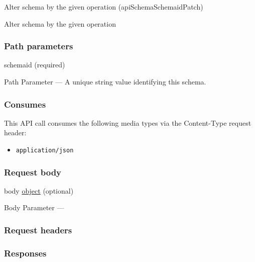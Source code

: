 \protect\hypertarget{apiSchemaSchemaidPatch}{}{}

\begin{Shaded}
\begin{Highlighting}[]
\end{Highlighting}
\end{Shaded}

Alter schema by the given operation ({apiSchemaSchemaidPatch})

Alter schema by the given operation

\hypertarget{path-parameters-78}{%
\subsubsection{Path parameters}\label{path-parameters-78}}

schemaid (required)

{Path Parameter} --- A unique string value identifying this schema.

\hypertarget{consumes-44}{%
\subsubsection{Consumes}\label{consumes-44}}

This API call consumes the following media types via the {Content-Type}
request header:

\begin{itemize}
\tightlist
\item
  \texttt{application/json}
\end{itemize}

\hypertarget{request-body-44}{%
\subsubsection{Request body}\label{request-body-44}}

body \protect\hyperlink{object}{object} (optional)

{Body Parameter} ---

\hypertarget{request-headers-77}{%
\subsubsection{Request headers}\label{request-headers-77}}

\hypertarget{responses-145}{%
\subsubsection{Responses}\label{responses-145}}


